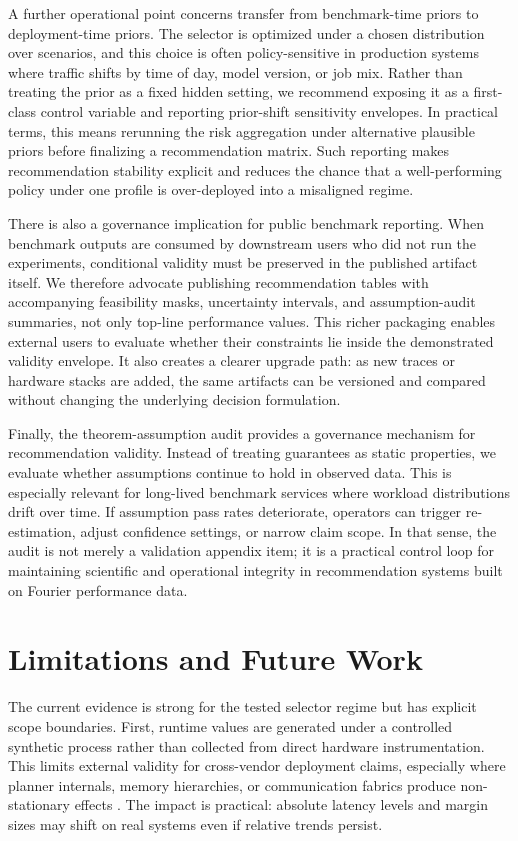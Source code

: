 \documentclass{article} %
\begin{document}
A further operational point concerns transfer from benchmark-time priors to deployment-time priors. The selector is optimized under a chosen distribution over scenarios, and this choice is often policy-sensitive in production systems where traffic shifts by time of day, model version, or job mix. Rather than treating the prior as a fixed hidden setting, we recommend exposing it as a first-class control variable and reporting prior-shift sensitivity envelopes. In practical terms, this means rerunning the risk aggregation under alternative plausible priors before finalizing a recommendation matrix. Such reporting makes recommendation stability explicit and reduces the chance that a well-performing policy under one profile is over-deployed into a misaligned regime.

There is also a governance implication for public benchmark reporting. When benchmark outputs are consumed by downstream users who did not run the experiments, conditional validity must be preserved in the published artifact itself. We therefore advocate publishing recommendation tables with accompanying feasibility masks, uncertainty intervals, and assumption-audit summaries, not only top-line performance values. This richer packaging enables external users to evaluate whether their constraints lie inside the demonstrated validity envelope. It also creates a clearer upgrade path: as new traces or hardware stacks are added, the same artifacts can be versioned and compared without changing the underlying decision formulation.

Finally, the theorem-assumption audit provides a governance mechanism for recommendation validity. Instead of treating guarantees as static properties, we evaluate whether assumptions continue to hold in observed data. This is especially relevant for long-lived benchmark services where workload distributions drift over time. If assumption pass rates deteriorate, operators can trigger re-estimation, adjust confidence settings, or narrow claim scope. In that sense, the audit is not merely a validation appendix item; it is a practical control loop for maintaining scientific and operational integrity in recommendation systems built on Fourier performance data.

\section{Limitations and Future Work}
The current evidence is strong for the tested selector regime but has explicit scope boundaries. First, runtime values are generated under a controlled synthetic process rather than collected from direct hardware instrumentation. This limits external validity for cross-vendor deployment claims, especially where planner internals, memory hierarchies, or communication fabrics produce non-stationary effects \citep{S08,S09,S25,S26,S39,S42}. The impact is practical: absolute latency levels and margin sizes may shift on real systems even if relative trends persist.
\end{document}
